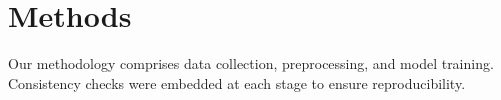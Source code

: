 \section{Methods}
Our methodology comprises data collection, preprocessing, and model training. Consistency checks were embedded at each stage to ensure reproducibility.
